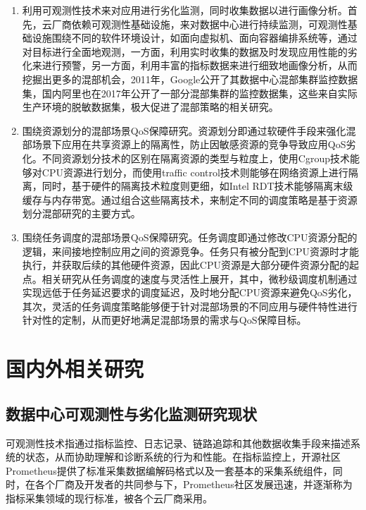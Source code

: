 \begin{enumerate}
    \item 利用可观测性技术来对应用进行劣化监测，同时收集数据以进行画像分析。首先，云厂商依赖可观测性基础设施，来对数据中心进行持续监测，可观测性基础设施围绕不同的软件环境设计，如面向虚拟机、面向容器编排系统等，通过对目标进行全面地观测，一方面，利用实时收集的数据及时发现应用性能的劣化来进行预警，另一方面，利用丰富的指标数据来进行细致地画像分析，从而挖掘出更多的混部机会，2011年，Google公开了其数据中心混部集群监控数据集，国内阿里也在2017年公开了一部分混部集群的监控数据集\citep{guo2019limits}，这些来自实际生产环境的脱敏数据集，极大促进了混部策略的相关研究。
    \item 围绕资源划分的混部场景QoS保障研究。资源划分即通过软硬件手段来强化混部场景下应用在共享资源上的隔离性，防止因敏感资源的竞争导致应用QoS劣化。不同资源划分技术的区别在隔离资源的类型与粒度上，使用Cgroup技术能够对CPU资源进行划分，而使用traffic control技术\citep{hubert2002linux}则能够在网络资源上进行隔离，同时，基于硬件的隔离技术粒度则更细，如Intel RDT技术\citep{guide2011intel}能够隔离末级缓存与内存带宽。通过组合这些隔离技术，来制定不同的调度策略是基于资源划分混部研究的主要方式。
    \item 围绕任务调度的混部场景QoS保障研究。任务调度即通过修改CPU资源分配的逻辑，来间接地控制应用之间的资源竞争。任务只有被分配到CPU资源时才能执行，并获取后续的其他硬件资源，因此CPU资源是大部分硬件资源分配的起点。相关研究从任务调度的速度与灵活性上展开，其中，微秒级调度机制通过实现远低于任务延迟要求的调度延迟，及时地分配CPU资源来避免QoS劣化，其次，灵活的任务调度策略能够便于针对混部场景的不同应用与硬件特性进行针对性的定制，从而更好地满足混部场景的需求与QoS保障目标。
\end{enumerate}

\section{国内外相关研究}

\subsection{数据中心可观测性与劣化监测研究现状}


可观测性技术指通过指标监控、日志记录、链路追踪和其他数据收集手段来描述系统的状态，从而协助理解和诊断系统的行为和性能。在指标监控上，开源社区Prometheus\citep{brazil2018prometheus}提供了标准采集数据编解码格式以及一套基本的采集系统组件，同时，在各个厂商及开发者的共同参与下，Prometheus社区发展迅速，并逐渐称为指标采集领域的现行标准，被各个云厂商采用。

